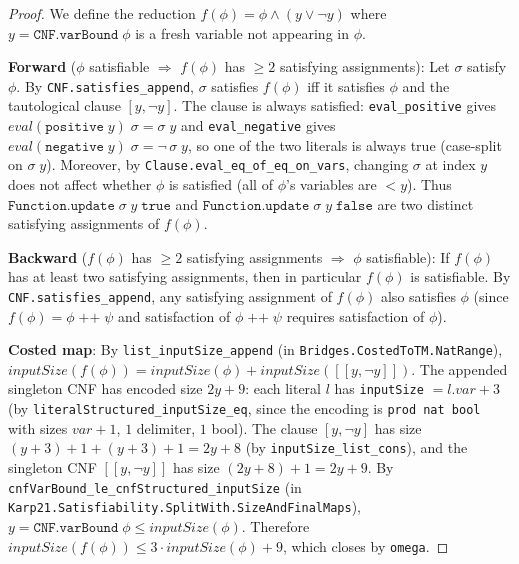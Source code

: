 \begin{proof}
  We define the reduction $f(\phi) = \phi \wedge (y \vee \neg y)$ where
  $y = \texttt{CNF.varBound}\;\phi$ is a fresh variable not appearing in $\phi$.

  \textbf{Forward} ($\phi$ satisfiable $\Rightarrow$ $f(\phi)$ has $\geq 2$
  satisfying assignments): Let $\sigma$ satisfy $\phi$. By
  \texttt{CNF.satisfies\_append}, $\sigma$ satisfies $f(\phi)$ iff it
  satisfies $\phi$ and the tautological clause $[y, \neg y]$. The clause is
  always satisfied: \texttt{eval\_positive} gives
  $\textit{eval}(\texttt{positive}\;y)\;\sigma = \sigma\;y$ and
  \texttt{eval\_negative} gives
  $\textit{eval}(\texttt{negative}\;y)\;\sigma = \neg\,\sigma\;y$, so one of
  the two literals is always true (case-split on $\sigma\;y$). Moreover, by
  \texttt{Clause.eval\_eq\_of\_eq\_on\_vars}, changing $\sigma$ at index $y$
  does not affect whether $\phi$ is satisfied (all of $\phi$'s variables are
  $< y$). Thus $\texttt{Function.update}\;\sigma\;y\;\texttt{true}$ and
  $\texttt{Function.update}\;\sigma\;y\;\texttt{false}$ are two distinct
  satisfying assignments of $f(\phi)$.

  \textbf{Backward} ($f(\phi)$ has $\geq 2$ satisfying assignments $\Rightarrow$
  $\phi$ satisfiable): If $f(\phi)$ has at least two satisfying assignments,
  then in particular $f(\phi)$ is satisfiable. By
  \texttt{CNF.satisfies\_append}, any satisfying assignment of $f(\phi)$
  also satisfies $\phi$ (since $f(\phi) = \phi \;\texttt{++}\; \psi$ and
  satisfaction of $\phi \;\texttt{++}\; \psi$ requires satisfaction of
  $\phi$).

 \textbf{Costed map}: By \texttt{list\_inputSize\_append} (in
 \texttt{Bridges.CostedToTM.NatRange}),
 $\textit{inputSize}(f(\phi)) = \textit{inputSize}(\phi) +
  \textit{inputSize}([[y, \neg y]])$.
  The appended singleton CNF has encoded size $2y + 9$: each literal $l$
  has \texttt{inputSize} $= l.\textit{var} + 3$ (by
  \texttt{literalStructured\_inputSize\_eq}, since the encoding is
  \texttt{prod nat bool} with sizes $\textit{var}+1$, $1$ delimiter, $1$
  bool). The clause $[y, \neg y]$ has size $(y{+}3)+1+(y{+}3)+1 = 2y{+}8$
  (by \texttt{inputSize\_list\_cons}), and the singleton CNF $[[y, \neg y]]$
  has size $(2y{+}8)+1 = 2y{+}9$.
  By \texttt{cnfVarBound\_le\_cnfStructured\_inputSize}
  (in \texttt{Karp21.Satisfiability.SplitWith.SizeAndFinalMaps}),
  $y = \texttt{CNF.varBound}\;\phi \le \textit{inputSize}(\phi)$.
  Therefore $\textit{inputSize}(f(\phi)) \le 3 \cdot \textit{inputSize}(\phi) + 9$,
  which closes by \texttt{omega}.


\end{proof}
